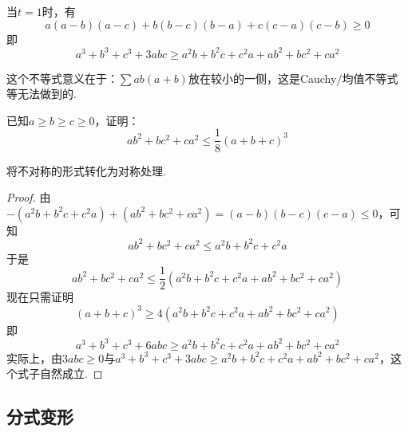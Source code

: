 \documentclass[lang=cn, zihao=4.5]{elegantbook}
\begin{document}
\begin{corollary}
	当$t=1$时，有$$a(a-b)(a-c) + b(b-c)(b-a) + c(c-a)(c-b) \geq 0$$
	即$$a^3+b^3+c^3+3abc \geq a^2b + b^2c + c^2a + ab^2 + bc^2 + ca^2$$
\end{corollary}
\begin{remark}
	这个不等式意义在于：$\sum ab(a+b)$放在较小的一侧，这是Cauchy/均值不等式等无法做到的.
\end{remark}

\begin{example} %
	已知$a \geq b \geq c \geq 0$，证明：$$ab^2+bc^2+ca^2 \leq \frac{1}{8} (a+b+c)^3$$
\end{example}
\begin{hint}
	将不对称的形式转化为对称处理.
\end{hint}
\begin{proof}
	由$-(a^2b+b^2c+c^2a)+(ab^2+bc^2+ca^2) = (a-b)(b-c)(c-a) \leq 0$，可知$$ab^2+bc^2+ca^2 \leq a^2b+b^2c+c^2a$$
	于是$$ab^2+bc^2+ca^2 \leq \frac{1}{2} (a^2b+b^2c+c^2a+ab^2+bc^2+ca^2)$$
	现在只需证明$$(a+b+c)^3 \geq 4(a^2b+b^2c+c^2a+ab^2+bc^2+ca^2)$$
	即$$a^3+b^3+c^3+6abc \geq a^2b+b^2c+c^2a+ab^2+bc^2+ca^2$$
	实际上，由$3abc \geq 0$与$a^3+b^3+c^3+3abc \geq a^2b + b^2c + c^2a + ab^2 + bc^2 + ca^2$，这个式子自然成立.
\end{proof}


\subsection{分式变形}
\end{document}
